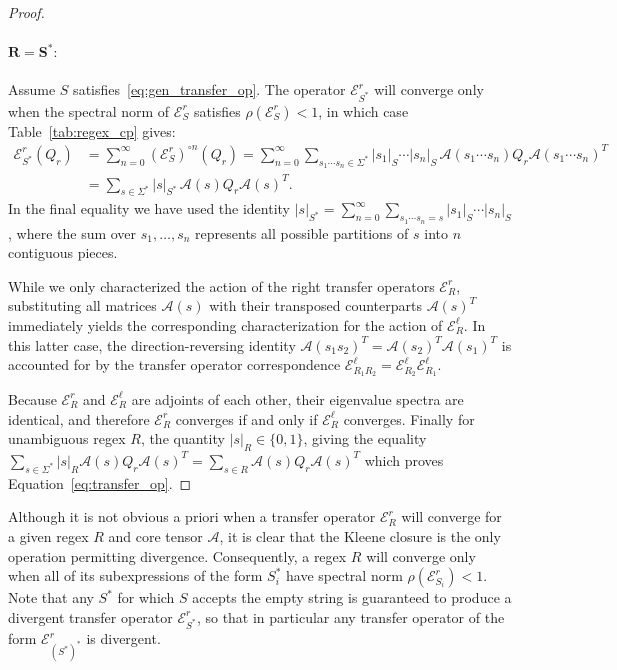 \documentclass[twoside]{article}
\newcommand{\EL}{\mc{E}^{\scriptstyle \ell}}
\newcommand{\ER}{\mc{E}^{\scriptstyle r}}
\newcommand{\QR}{Q_{r}}
\newcommand{\sR}{|s|_R}
\newcommand{\mc}[1]{\mathcal{#1}}
\begin{document}
\begin{proof}
\paragraph{$\mathbf{R = S^*:}$} Assume $S$ satisfies~\eqref{eq:gen_transfer_op}. The operator $\ER_{S^*}$ will converge only when the spectral norm of $\ER_S$ satisfies $\rho(\ER_S) < 1$, in which case Table~\ref{tab:regex_cp} 
gives:
%
\begin{align*}
    \ER_{S^*}(\QR) &= \sum_{n=0}^\infty (\ER_{S})^{\circ n}(\QR) = \sum_{n=0}^\infty \sum_{s_1\cdots s_n \in \Sigma^*} |s_1|_{S} \cdots |s_n|_S\, \mc{A}(s_1 \cdots s_n) \QR \mc{A}(s_1 \cdots s_n)^T \\
    &= \sum_{s \in \Sigma^*} |s|_{S^*}\, \mc{A}(s) \QR \mc{A}(s)^T.
\end{align*}
%
In the final equality we have used the identity $|s|_{S^*} = \sum_{n=0}^\infty \sum_{s_1 \cdots s_n = s} |s_1|_{S} \cdots |s_n|_{S}$, where the sum over $s_1, \ldots, s_n$ represents all possible partitions of $s$ into $n$ contiguous pieces. 

While we only characterized the action of the right transfer operators $\ER_R$, substituting all matrices $\mc{A}(s)$ with their transposed counterparts $\mc{A}(s)^T$ immediately yields the corresponding characterization for the action of $\EL_R$. In this latter case, the direction-reversing identity $\mc{A}(s_1 s_2)^T = \mc{A}(s_2)^T \mc{A}(s_1)^T$ is accounted for by the transfer operator correspondence $\EL_{R_1 R_2} = \EL_{R_2}\EL_{R_1}$. 

Because $\ER_R$ and $\EL_R$ are adjoints of each other, their eigenvalue spectra are identical, and therefore $\ER_R$ converges if and only if $\EL_R$ converges. Finally for unambiguous regex $R$, the quantity $\sR \in \{0, 1\}$, giving the equality $\sum_{s\in \Sigma^*} \sR \mc{A}(s) \QR \mc{A}(s)^T = \sum_{s\in R} \mc{A}(s) \QR \mc{A}(s)^T$ which proves Equation~\ref{eq:transfer_op}.
   
\end{proof}

Although it is not obvious a priori when a transfer operator $\ER_R$ will converge for a given regex $R$ and core tensor $\mc{A}$, it is clear that the Kleene closure is the only operation permitting divergence. Consequently, a regex $R$ will converge only when all of its subexpressions of the form $S_i^*$ have spectral norm $\rho(\ER_{S_i}) < 1$. Note that any $S^*$ for which $S$ accepts the empty string is guaranteed to produce a divergent transfer operator $\ER_{S^*}$, so that in particular any transfer operator of the form $\ER_{(S^*)^*}$ is divergent.
\end{document}
